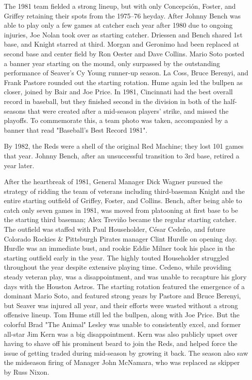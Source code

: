 The 1981 team fielded a strong lineup, but with only Concepción, Foster,
and Griffey retaining their spots from the 1975--76 heyday. After Johnny
Bench was able to play only a few games at catcher each year after 1980
due to ongoing injuries, Joe Nolan took over as starting catcher.
Driessen and Bench shared 1st base, and Knight starred at third. Morgan
and Geronimo had been replaced at second base and center field by Ron
Oester and Dave Collins. Mario Soto posted a banner year starting on the
mound, only surpassed by the outstanding performance of Seaver's Cy
Young runner-up season. La Coss, Bruce Berenyi, and Frank Pastore
rounded out the starting rotation. Hume again led the bullpen as closer,
joined by Bair and Joe Price. In 1981, Cincinnati had the best overall
record in baseball, but they finished second in the division in both of
the half-seasons that were created after a mid-season players' strike,
and missed the playoffs. To commemorate this, a team photo was taken,
accompanied by a banner that read "Baseball's Best Record 1981".

By 1982, the Reds were a shell of the original Red Machine; they lost
101 games that year. Johnny Bench, after an unsuccessful transition to
3rd base, retired a year later.

After the heartbreak of 1981, General Manager Dick Wagner pursued the
strategy of ridding the team of veterans including third-baseman Knight
and the entire starting outfield of Griffey, Foster, and Collins. Bench,
after being able to catch only seven games in 1981, was moved from
platooning at first base to be the starting third baseman; Alex Treviño
became the regular starting catcher. The outfield was staffed with Paul
Householder, César Cedeño, and future Colorado Rockies \& Pittsburgh
Pirates manager Clint Hurdle on opening day. Hurdle was an immediate
bust, and rookie Eddie Milner took his place in the starting outfield
early in the year. The highly touted Householder struggled throughout
the year despite extensive playing time. Cedeno, while providing steady
veteran play, was a disappointment, and was unable to recapture his
glory days with the Houston Astros. The starting rotation featured the
emergence of a dominant Mario Soto, and featured strong years by Pastore
and Bruce Berenyi, but Seaver was injured all year, and their efforts
were wasted without a strong offensive lineup. Tom Hume still led the
bullpen, along with Joe Price. But the colorful Brad "The Animal" Lesley
was unable to consistently excel, and former all-star Jim Kern was a big
disappointment. Kern was also publicly upset over having to shave off
his prominent beard to join the Reds, and helped force the issue of
getting traded during mid-season by growing it back. The season also saw
the midseason firing of Manager John McNamara, who was replaced as
skipper by Russ Nixon.

